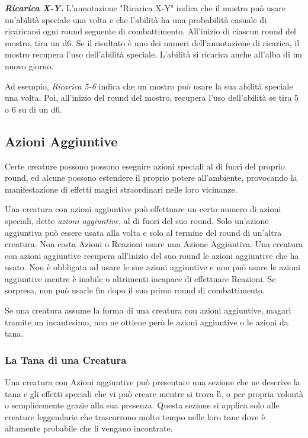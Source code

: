 \begin{multicols}{2}
\emph{\textbf{Ricarica X-Y.}} L'annotazione "Ricarica X-Y" indica che il mostro può usare un'abilità speciale una volta e che l'abilità ha una probabilità casuale di ricaricarsi ogni round seguente di combattimento. All'inizio di ciascun round del mostro, tira un d6. Se il risultato è uno dei numeri dell'annotazione di ricarica, il mostro recupera l'uso dell'abilità speciale. L'abilità si ricarica anche all'alba di un nuovo giorno.

Ad esempio, \emph{Ricarica 5-6} indica che un mostro può usare la sua abilità speciale una volta. Poi, all'inizio del round del mostro, recupera l'uso dell'abilità se tira 5 o 6 su di un d6.

\subsection{Azioni Aggiuntive}

Certe creature possono possono eseguire azioni speciali al di fuori del proprio round, ed alcune possono estendere il proprio potere all'ambiente, provocando la manifestazione di effetti magici straordinari nelle loro vicinanze.

Una creatura con azioni aggiuntive può effettuare un certo numero di azioni speciali, dette \emph{azioni aggiuntive}, al di fuori del suo round. Solo un'azione aggiuntiva può essere usata alla volta e solo al termine del round di un'altra creatura. Non costa Azioni o Reazioni usare una Azione Aggiuntiva. Una creatura con azioni aggiuntive recupera all'inizio del suo round le azioni aggiuntive che ha usato. Non è obbligata ad usare le sue azioni aggiuntive e non può usare le azioni aggiuntive mentre è inabile o altrimenti incapace di effettuare Reazioni. Se sorpresa, non può usarle fin dopo il suo primo round di combattimento.

Se una creatura assume la forma di una creatura con azioni aggiuntive, magari tramite un incantesimo, non ne ottiene però le azioni aggiuntive o le azioni da tana.

\subsubsection{La Tana di una Creatura}

Una creatura con Azioni aggiuntive può presentare una sezione che ne descrive la tana e gli effetti speciali che vi può creare mentre si trova lì, o per propria volontà o semplicemente grazie alla sua presenza. Questa sezione si applica solo alle creature leggendarie che trascorrono molto tempo nelle loro tane dove è altamente probabile che li vengano incontrate.


\end{multicols}
